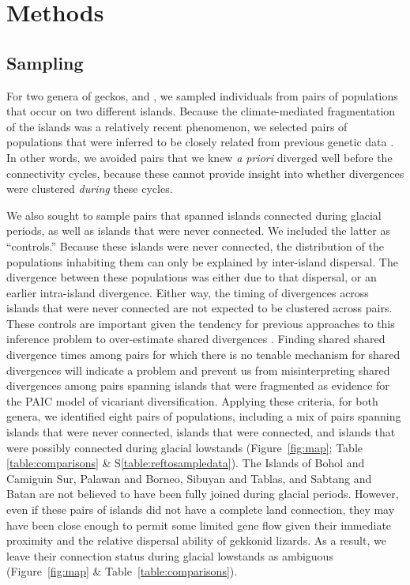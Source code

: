 \section{Methods}

\subsection{Sampling}
For two genera of geckos,  and , we sampled
individuals from pairs of populations that occur on two different islands.
Because the climate-mediated fragmentation of the islands was a relatively
recent phenomenon, we selected pairs of populations that were inferred to be
closely related from previous genetic data
\citep{Siler2012, Siler2014kikuchii, Welton2010, Welton2010zootaxa, Siler2010}.
In other words, we avoided pairs that we knew \emph{a priori} diverged well
before the connectivity cycles, because these cannot provide insight into
whether divergences were clustered \emph{during} these cycles.

We also sought to sample pairs that spanned islands connected during glacial
periods, as well as islands that were never connected.
We included the latter as ``controls.''
Because these islands were never connected, the distribution of the populations
inhabiting them can only be explained by inter-island dispersal.
The divergence between these populations was either due to that
dispersal, or an earlier intra-island divergence.
Either way, the timing of divergences across islands that were never connected
are not expected to be clustered across pairs.
These controls are important given the tendency for previous approaches to this
inference problem to over-estimate shared divergences
\citep{Oaks2012,Oaks2014reply}.
Finding shared shared divergence times among pairs for which there is no
tenable mechanism for shared divergences will indicate a problem and prevent us
from misinterpreting shared divergences among pairs spanning islands that were
fragmented as evidence for the PAIC model of vicariant diversification.
Applying these criteria, for both genera, we identified eight pairs of
populations, including a mix of pairs spanning islands that were never
connected, islands that were connected, and islands that were possibly
connected during glacial lowstands
(Figure~\ref{fig:map};
Table \ref{table:comparisons} \& S\ref{table:reftosampledata}).
The Islands of
Bohol and Camiguin Sur,
Palawan and Borneo,
Sibuyan and Tablas, 
and
Sabtang and Batan
are not believed to
have been fully joined during glacial periods.
However, even if these pairs of islands did not have a complete land
connection, they may have been close enough to permit some limited gene flow
given their immediate proximity and the relative dispersal ability of gekkonid
lizards.
As a result, we leave their connection status during glacial lowstands as
ambiguous 
(Figure~\ref{fig:map} \& Table~\ref{table:comparisons}).

